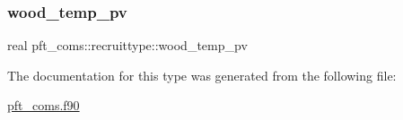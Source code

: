 \mbox{\label{structpft__coms_1_1recruittype_a0d5f8dd1bdc575a902052df9d43d26e5}} 
\subsubsection{\texorpdfstring{wood\+\_\+temp\+\_\+pv}{wood\_temp\_pv}}
{\footnotesize\ttfamily real pft\+\_\+coms\+::recruittype\+::wood\+\_\+temp\+\_\+pv}



The documentation for this type was generated from the following file\+:\begin{DoxyCompactItemize}
\item 
\hyperlink{pft__coms_8f90}{pft\+\_\+coms.\+f90}\end{DoxyCompactItemize}

